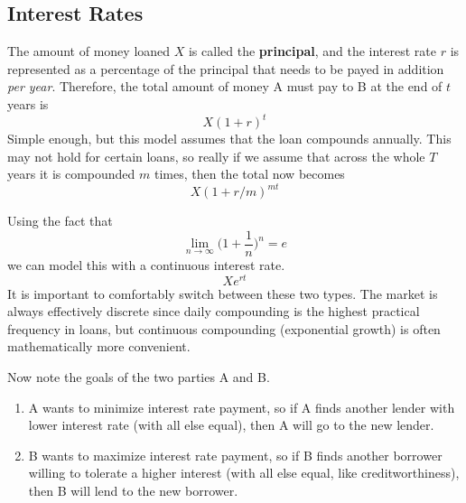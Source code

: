 \documentclass{article}
\begin{document}
  \subsection{Interest Rates} 

    The amount of money loaned $X$ is called the \textbf{principal}, and the interest rate $r$ is represented as a percentage of the principal that needs to be payed in addition \textit{per year}. Therefore, the total amount of money A must pay to B at the end of $t$ years is 
    \begin{equation}
      X (1 + r)^t
    \end{equation} 
    Simple enough, but this model assumes that the loan compounds annually. This may not hold for certain loans, so really if we assume that across the whole $T$ years it is compounded $m$ times, then the total now becomes 
    \begin{equation}
      X (1 + r/m)^{mt}
    \end{equation}

    Using the fact that 
    \begin{equation}
      \lim_{n \rightarrow \infty} \bigg( 1 + \frac{1}{n}\bigg)^n = e
    \end{equation}
    we can model this with a continuous interest rate. 
    \begin{equation}
      X e^{rt}
    \end{equation}
    It is important to comfortably switch between these two types. The market is always effectively discrete since daily compounding is the highest practical frequency in loans, but continuous compounding (exponential growth) is often mathematically more convenient. 

    Now note the goals of the two parties A and B. 
    \begin{enumerate}
      \item A wants to minimize interest rate payment, so if A finds another lender with lower interest rate (with all else equal), then A will go to the new lender. 
      \item B wants to maximize interest rate payment, so if B finds another borrower willing to tolerate a higher interest (with all else equal, like creditworthiness), then B will lend to the new borrower. 
    \end{enumerate}
\end{document}
